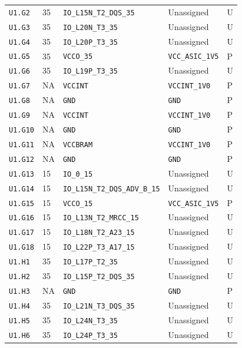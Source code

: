 \documentclass[11pt,a4paper]{article}
\begin{document}
\begin{longtable}{@{}P{20mm}P{10mm}P{75mm}P{49mm}P{7mm}@{}}
\nolinkurl{U1.G2} & 35 & \nolinkurl{IO_L15N_T2_DQS_35} & Unassigned & U \\
\nolinkurl{U1.G3} & 35 & \nolinkurl{IO_L20N_T3_35} & Unassigned & U \\
\nolinkurl{U1.G4} & 35 & \nolinkurl{IO_L20P_T3_35} & Unassigned & U \\
\nolinkurl{U1.G5} & 35 & \nolinkurl{VCCO_35} & \nolinkurl{VCC_ASIC_1V5} & P \\
\nolinkurl{U1.G6} & 35 & \nolinkurl{IO_L19P_T3_35} & Unassigned & U \\
\nolinkurl{U1.G7} & NA & \nolinkurl{VCCINT} & \nolinkurl{VCCINT_1V0} & P \\
\nolinkurl{U1.G8} & NA & \nolinkurl{GND} & \nolinkurl{GND} & P \\
\nolinkurl{U1.G9} & NA & \nolinkurl{VCCINT} & \nolinkurl{VCCINT_1V0} & P \\
\nolinkurl{U1.G10} & NA & \nolinkurl{GND} & \nolinkurl{GND} & P \\
\nolinkurl{U1.G11} & NA & \nolinkurl{VCCBRAM} & \nolinkurl{VCCINT_1V0} & P \\
\nolinkurl{U1.G12} & NA & \nolinkurl{GND} & \nolinkurl{GND} & P \\
\nolinkurl{U1.G13} & 15 & \nolinkurl{IO_0_15} & Unassigned & U \\
\nolinkurl{U1.G14} & 15 & \nolinkurl{IO_L15N_T2_DQS_ADV_B_15} & Unassigned & U \\
\nolinkurl{U1.G15} & 15 & \nolinkurl{VCCO_15} & \nolinkurl{VCC_ASIC_1V5} & P \\
\nolinkurl{U1.G16} & 15 & \nolinkurl{IO_L13N_T2_MRCC_15} & Unassigned & U \\
\nolinkurl{U1.G17} & 15 & \nolinkurl{IO_L18N_T2_A23_15} & Unassigned & U \\
\nolinkurl{U1.G18} & 15 & \nolinkurl{IO_L22P_T3_A17_15} & Unassigned & U \\
\nolinkurl{U1.H1} & 35 & \nolinkurl{IO_L17P_T2_35} & Unassigned & U \\
\nolinkurl{U1.H2} & 35 & \nolinkurl{IO_L15P_T2_DQS_35} & Unassigned & U \\
\nolinkurl{U1.H3} & NA & \nolinkurl{GND} & \nolinkurl{GND} & P \\
\nolinkurl{U1.H4} & 35 & \nolinkurl{IO_L21N_T3_DQS_35} & Unassigned & U \\
\nolinkurl{U1.H5} & 35 & \nolinkurl{IO_L24N_T3_35} & Unassigned & U \\
\nolinkurl{U1.H6} & 35 & \nolinkurl{IO_L24P_T3_35} & Unassigned & U \\

\end{longtable}
\end{document}
